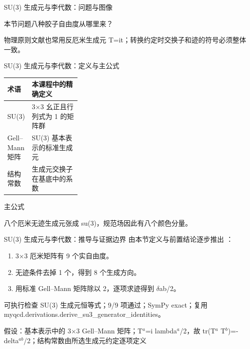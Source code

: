 \begin{frame}[t]{SU(3) 生成元与李代数：问题与图像}
\footnotesize
\begin{block}{本节问题}八种胶子自由度从哪里来？\end{block}
\begin{block}{物理原则}\quad 文献也常用反厄米生成元 T=it；转换约定时交换子和迹的符号必须整体一致。\end{block}
\end{frame}

\begin{frame}[t]{SU(3) 生成元与李代数：定义与主公式}
\footnotesize\begin{tabularx}{\linewidth}{p{0.30\linewidth}Y}
\toprule 术语 & 本课程中的精确定义\\\midrule
{} SU(3) & 3\ensuremath{\times}3 幺正且行列式为 1 的矩阵群\\
 Gell--Mann 矩阵 & SU(3) 基本表示的标准生成元\\
 结构常数 & 生成元交换子在基底中的系数\\
\bottomrule\end{tabularx}\vspace{0.15cm}
\begin{block}{ 主公式}\centering{}\end{block}
八个厄米无迹生成元张成 su(3)，规范场因此有八个颜色分量。
\end{frame}

\begin{frame}[t]{SU(3) 生成元与李代数：推导与证据边界}
\footnotesize
{}\quad 由本节定义与前置结论逐步推出 ：
\begin{enumerate}
\item 3\ensuremath{\times}3 厄米矩阵有 9 个实自由度。
\item 无迹条件去掉 1 个，得到 8 个生成方向。
\item 用标准 Gell--Mann 矩阵除以 2，逐项求迹得到 \ensuremath{\delta}ab/\allowbreak{}2。
\end{enumerate}\begin{block}{可执行检查}
\quad SU(3) 生成元恒等式；9/9 项通过；SymPy exact；复用 myqcd.derivations.derive\_su3\_generator\_identities。
\par\scriptsize 假设：基本表示中的 3\ensuremath{\times}3 Gell--Mann 矩阵；T\ensuremath{^{a}}=i lambda\ensuremath{^{a}}/\allowbreak{}2，故 tr(T\ensuremath{^{a}} T\ensuremath{^{b}})=-delta\ensuremath{^{ab}}/\allowbreak{}2；结构常数由所选生成元约定逐项定义
\end{block}
\end{frame}

